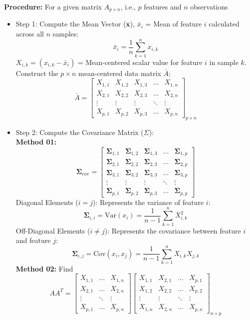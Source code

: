 \documentclass[DIV=20,oneside]{scrartcl}
\begin{document}
\textbf{Procedure: } For a given matrix $A_{p\times n}$, i.e., $p$ features and $n$ observations\\
\begin{itemize}
	\item Step 1: Compute the Mean Vector ($\mathbf{\bar{x}}$), $\bar{x}_i$ = Mean of feature $i$ calculated across all $n$ samples:$$\bar{x}_i = \frac{1}{n} \sum_{k=1}^{n} x_{i, k}$$$X_{i, k} = (x_{i, k} - \bar{x}_i)$ = Mean-centered scalar value for feature $i$ in sample $k$.\\
	Construct the $p \times n$ mean-centered data matrix $\bar{A}$:$$\bar{A} = \begin{bmatrix} X_{1,1} & X_{1,2} & X_{1,3} & \dots & X_{1,n} \\ X_{2,1} & X_{2,2} & X_{2,3} & \dots & X_{2,n} \\ \vdots & \vdots & \vdots & \ddots & \vdots \\ X_{p,1} & X_{p,2} & X_{p,3} & \dots & X_{p,n} \end{bmatrix}_{p \times n}$$
	\item Step 2: Compute the Covariance Matrix ($\Sigma$):\\
		\textbf{Method 01:} $$\boldsymbol{\Sigma}_{\text{cov}} = \begin{bmatrix} \boldsymbol{\Sigma}_{1,1} & \boldsymbol{\Sigma}_{1,2} & \boldsymbol{\Sigma}_{1,3} & \dots & \boldsymbol{\Sigma}_{1,p} \\ \boldsymbol{\Sigma}_{2,1} & \boldsymbol{\Sigma}_{2,2} & \boldsymbol{\Sigma}_{2,3} & \dots & \boldsymbol{\Sigma}_{2,p} \\ \boldsymbol{\Sigma}_{3,1} & \boldsymbol{\Sigma}_{3,2} & \boldsymbol{\Sigma}_{3,3} & \dots & \boldsymbol{\Sigma}_{3,p} \\ \vdots & \vdots & \vdots & \ddots & \vdots \\ \boldsymbol{\Sigma}_{p,1} & \boldsymbol{\Sigma}_{p,2} & \boldsymbol{\Sigma}_{p,3} & \dots & \boldsymbol{\Sigma}_{p,p} \end{bmatrix}$$
	 Diagonal Elements ($i = j$): Represents the variance of feature $i$:$$\boldsymbol{\Sigma}_{i, i} = \text{Var}(x_i) = \frac{1}{n - 1} \sum_{k=1}^{n} X_{i, k}^2$$Off-Diagonal Elements ($i \neq j$): Represents the covariance between feature $i$ and feature $j$:$$\boldsymbol{\Sigma}_{i, j} = \text{Cov}(x_i, x_j) = \frac{1}{n - 1} \sum_{k=1}^{n} X_{i, k} X_{j, k}$$
	\textbf{Method 02: } 
	Find 
	$$AA^T = \begin{bmatrix} X_{1,1} & \dots & X_{1,n} \\ X_{2,1} & \dots & X_{2,n} \\ \vdots & \ddots & \vdots \\ X_{p,1} & \dots & X_{p,n} \end{bmatrix} \begin{bmatrix} X_{1,1} & X_{2,1} & \dots & X_{p,1} \\ X_{1,2} & X_{2,2} & \dots & X_{p,2} \\ \vdots & \vdots & \ddots & \vdots \\ X_{1,n} & X_{2,n} & \dots & X_{p,n} \end{bmatrix}_{n \times p}$$				

\end{itemize}
\end{document}
